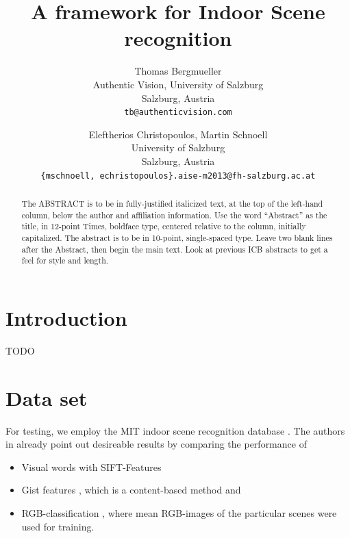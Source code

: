 \documentclass[10pt,twocolumn,letterpaper]{article}
\begin{document}
\title{A framework for Indoor Scene recognition}

\author{Thomas Bergmueller\\
Authentic Vision, University of Salzburg\\
Salzburg, Austria\\
{\tt\small tb@authenticvision.com}
\and
Eleftherios Christopoulos, Martin Schnoell\\
University of Salzburg\\
Salzburg, Austria\\
{\tt\small \{mschnoell, echristopoulos\}.aise-m2013@fh-salzburg.ac.at}
}

\maketitle
\thispagestyle{empty}

\begin{abstract}
   The ABSTRACT is to be in fully-justified italicized text, at the top
   of the left-hand column, below the author and affiliation
   information. Use the word ``Abstract'' as the title, in 12-point
   Times, boldface type, centered relative to the column, initially
   capitalized. The abstract is to be in 10-point, single-spaced type.
   Leave two blank lines after the Abstract, then begin the main text.
   Look at previous ICB abstracts to get a feel for style and length.
\end{abstract}

\section{Introduction}
TODO

\section{Data set}
\label{sec:data}
For testing, we employ the MIT indoor scene recognition database \cite{indoorScenes}. The authors in \cite{indoorScenes} already point out desireable results by comparing the performance of 
\begin{itemize}
	\item Visual words with SIFT-Features
	\item Gist features \cite{oliva06}, which is a content-based method and
	\item RGB-classification \cite{indoorScenes}, where mean RGB-images of the particular scenes were used for training.
\end{itemize}
\end{document}

